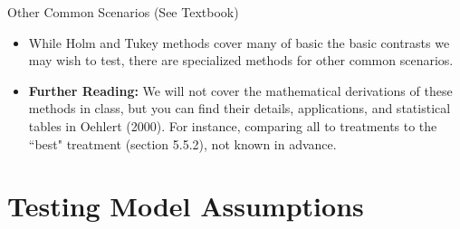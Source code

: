 \begin{frame}[allowframebreaks]{Other Common Scenarios (See Textbook)}
  \begin{itemize}
    \item While Holm and Tukey methods cover many of basic the basic contrasts we may wish to test, there are specialized methods for other common scenarios.
    \item \textbf{Further Reading:} We will not cover the mathematical derivations of these methods in class, but you can find their details, applications, and statistical tables in Oehlert (2000). For instance, comparing all to treatments to the ``best" treatment (section 5.5.2), not known in advance.
  \end{itemize}
  
\end{frame}

\section{Testing Model Assumptions}


